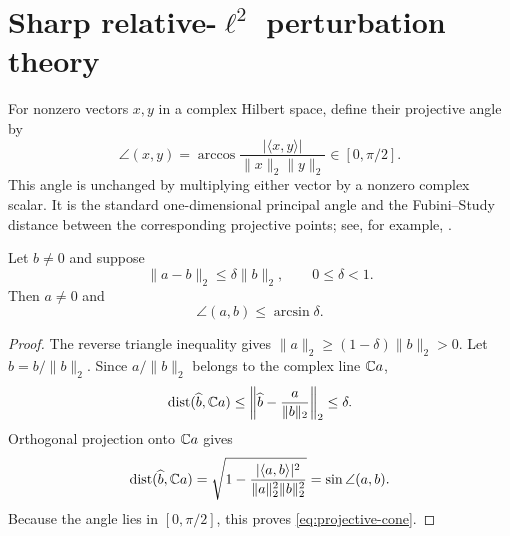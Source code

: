 \section{Sharp relative-\texorpdfstring{\(\ell^2\)}{l2}
perturbation theory}
\label{sec:sharp-perturbation}

For nonzero vectors \(x,y\) in a complex Hilbert space, define their
projective angle by
\[
 \angle(x,y)
 =\arccos\frac{|\langle x,y\rangle|}
 {\|x\|_2\|y\|_2}
 \in[0,\pi/2].
\]
This angle is unchanged by multiplying either vector by a nonzero
complex scalar.  It is the standard one-dimensional principal angle
and the Fubini--Study distance between the corresponding projective
points; see, for example, \citet{Bhatia1997,StewartSun1990}.

\begin{lemma}
\label{lem:relative-ball-cone}
Let \(b\ne0\) and suppose
\[
 \|a-b\|_2\le\delta\|b\|_2,\qquad 0\le\delta<1.
\]
Then \(a\ne0\) and
\begin{equation}
 \boxed{
 \angle(a,b)\le\arcsin\delta.}
\label{eq:projective-cone}
\end{equation}
\end{lemma}

\begin{proof}
The reverse triangle inequality gives
\(\|a\|_2\ge(1-\delta)\|b\|_2>0\).
Let \(\widehat b=b/\|b\|_2\).  Since
\(a/\|b\|_2\) belongs to the complex line \(\mathbb C a\),
\[
 \operatorname{dist}(\widehat b,\mathbb C a)
 \le
 \left\|\widehat b-\frac{a}{\|b\|_2}\right\|_2
 \le\delta.
\]
Orthogonal projection onto \(\mathbb C a\) gives
\[
 \operatorname{dist}(\widehat b,\mathbb C a)
 =
 \sqrt{1-
 \frac{|\langle a,b\rangle|^2}
 {\|a\|_2^2\|b\|_2^2}}
 =
 \sin\angle(a,b).
\]
Because the angle lies in \([0,\pi/2]\), this proves
\eqref{eq:projective-cone}.
\end{proof}

